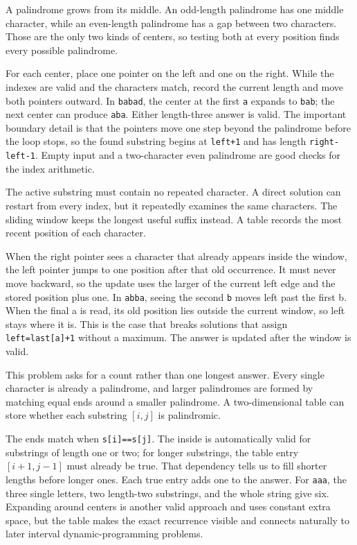 \expandafter\def\csname sourcewalkthrough@29\endcsname{%
A palindrome grows from its middle. An odd-length palindrome has one middle
character, while an even-length palindrome has a gap between two characters.
Those are the only two kinds of centers, so testing both at every position
finds every possible palindrome.

For each center, place one pointer on the left and one on the right. While the
indexes are valid and the characters match, record the current length and
move both pointers outward. In \texttt{babad}, the center at the first
\texttt{a} expands to \texttt{bab}; the next center can produce
\texttt{aba}. Either length-three answer is valid. The important boundary
detail is that the pointers move one step beyond the palindrome before the
loop stops, so the found substring begins at \texttt{left+1} and has length
\texttt{right-left-1}. Empty input and a two-character even palindrome are
good checks for the index arithmetic.}

\expandafter\def\csname sourcewalkthrough@30\endcsname{%
The active substring must contain no repeated character. A direct solution
can restart from every index, but it repeatedly examines the same characters.
The sliding window keeps the longest useful suffix instead. A table records
the most recent position of each character.

When the right pointer sees a character that already appears inside the
window, the left pointer jumps to one position after that old occurrence. It
must never move backward, so the update uses the larger of the current left
edge and the stored position plus one. In \texttt{abba}, seeing the second
\texttt{b} moves left past the first b. When the final a is read, its old
position lies outside the current window, so left stays where it is. This is
the case that breaks solutions that assign \texttt{left=last[a]+1} without a
maximum. The answer is updated after the window is valid.}

\expandafter\def\csname sourcewalkthrough@31\endcsname{%
This problem asks for a count rather than one longest answer. Every single
character is already a palindrome, and larger palindromes are formed by
matching equal ends around a smaller palindrome. A two-dimensional table can
store whether each substring \([i,j]\) is palindromic.

The ends match when \texttt{s[i]==s[j]}. The inside is automatically valid
for substrings of length one or two; for longer substrings, the table entry
\([i+1,j-1]\) must already be true. That dependency tells us to fill shorter
lengths before longer ones. Each true entry adds one to the answer. For
\texttt{aaa}, the three single letters, two length-two substrings, and the
whole string give six. Expanding around centers is another valid approach and
uses constant extra space, but the table makes the exact recurrence visible
and connects naturally to later interval dynamic-programming problems.}

